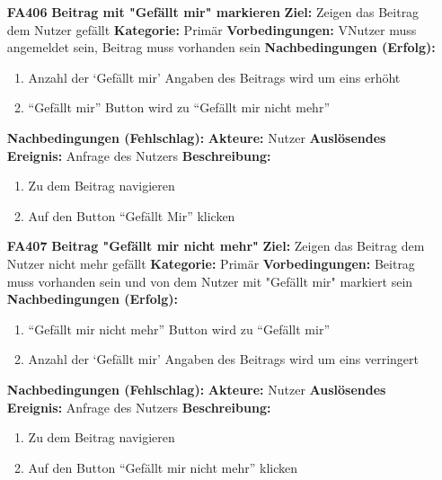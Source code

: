\documentclass[parskip=full]{scrartcl}
\begin{document}
\begin{itemize}[nosep]
			\item[\textbf{FA406}]\textbf{Beitrag mit "Gefällt mir" markieren}
			\newline \textbf{Ziel:} Zeigen das Beitrag dem Nutzer gefällt
			\newline \textbf{Kategorie:} Primär
			\newline \textbf{Vorbedingungen:} VNutzer muss angemeldet sein, Beitrag muss vorhanden sein
			\newline \textbf{Nachbedingungen (Erfolg):} 
			\begin{enumerate}[nosep]
				\item Anzahl der ‘Gefällt mir’ Angaben des Beitrags wird um eins erhöht
				\item “Gefällt mir” \gls{Button} wird zu “Gefällt mir nicht mehr”
			\end{enumerate}
			\textbf{Nachbedingungen (Fehlschlag):}
			\newline \textbf{Akteure:} Nutzer
			\newline \textbf{Auslösendes Ereignis:} Anfrage des Nutzers
			\newline \textbf{Beschreibung:}
			\begin{enumerate}[nosep]
				\item Zu dem Beitrag navigieren
				\item Auf den \gls{Button} “Gefällt Mir” klicken\\
			\end{enumerate}
			
			
			\newpage
			\item[\textbf{FA407}]\textbf{Beitrag "Gefällt mir nicht mehr"}
			\newline \textbf{Ziel:} Zeigen das Beitrag dem Nutzer nicht mehr gefällt
			\newline \textbf{Kategorie:} Primär
			\newline \textbf{Vorbedingungen:} Beitrag muss vorhanden sein und von dem Nutzer mit "Gefällt mir" markiert sein
			\newline \textbf{Nachbedingungen (Erfolg):} 
			\begin{enumerate}[nosep]
				\item “Gefällt mir nicht mehr” \gls{Button} wird zu “Gefällt mir”
				\item Anzahl der ‘Gefällt mir’ Angaben des Beitrags wird um eins  verringert 
			\end{enumerate}
			\textbf{Nachbedingungen (Fehlschlag):}
			\newline \textbf{Akteure:} Nutzer
			\newline \textbf{Auslösendes Ereignis:} Anfrage des Nutzers
			\newline \textbf{Beschreibung:}
			\begin{enumerate}[nosep]
				\item Zu dem Beitrag navigieren
				\item Auf den \gls{Button} “Gefällt mir nicht mehr” klicken\\
			\end{enumerate}
			

\end{itemize}
\end{document}
